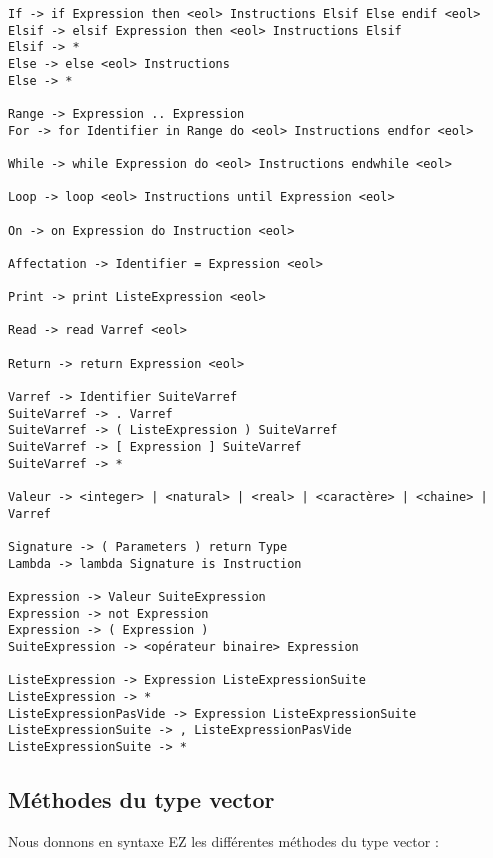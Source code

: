 \begin{verbatim}
If -> if Expression then <eol> Instructions Elsif Else endif <eol>
Elsif -> elsif Expression then <eol> Instructions Elsif
Elsif -> *
Else -> else <eol> Instructions
Else -> *

Range -> Expression .. Expression
For -> for Identifier in Range do <eol> Instructions endfor <eol>

While -> while Expression do <eol> Instructions endwhile <eol>

Loop -> loop <eol> Instructions until Expression <eol>

On -> on Expression do Instruction <eol>

Affectation -> Identifier = Expression <eol>

Print -> print ListeExpression <eol>

Read -> read Varref <eol>

Return -> return Expression <eol>

Varref -> Identifier SuiteVarref
SuiteVarref -> . Varref
SuiteVarref -> ( ListeExpression ) SuiteVarref
SuiteVarref -> [ Expression ] SuiteVarref
SuiteVarref -> *

Valeur -> <integer> | <natural> | <real> | <caractère> | <chaine> | Varref

Signature -> ( Parameters ) return Type
Lambda -> lambda Signature is Instruction

Expression -> Valeur SuiteExpression
Expression -> not Expression
Expression -> ( Expression )
SuiteExpression -> <opérateur binaire> Expression

ListeExpression -> Expression ListeExpressionSuite
ListeExpression -> *
ListeExpressionPasVide -> Expression ListeExpressionSuite
ListeExpressionSuite -> , ListeExpressionPasVide
ListeExpressionSuite -> *

\end{verbatim}


\subsection{Méthodes du type vector}

Nous donnons en syntaxe EZ les différentes méthodes du type vector :

